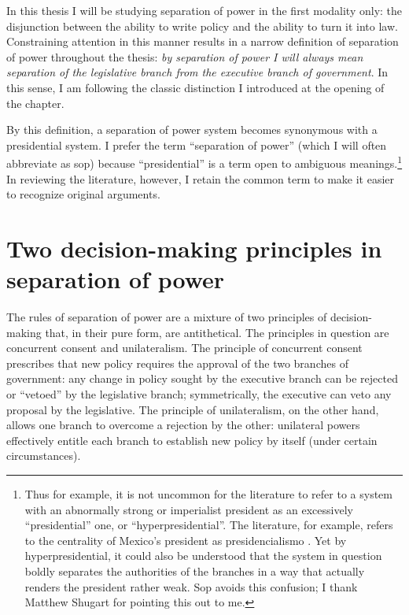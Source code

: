 In this thesis I will be studying separation of power in the first modality only: the disjunction between the ability to write policy and the ability to turn it into law.  Constraining attention in this manner results in a narrow definition of separation of power throughout the thesis: \emph{by separation of power I will always mean separation of the legislative branch from the executive branch of government}.  In this sense, I am following the classic distinction I introduced at the opening of the chapter.  

By this definition, a separation of power system becomes synonymous with a presidential system.  I prefer the term ``separation of power'' (which I will often abbreviate as sop) because ``presidential'' is a term open to ambiguous meanings.\footnote{Thus for example, it is not uncommon for the literature to refer to a system with an abnormally strong or imperialist president as an excessively ``presidential'' one, or ``hyperpresidential''.  The literature, for example, refers to the centrality of Mexico's president as presidencialismo \citep{carpizo.1978,weldon.1997}. Yet by hyperpresidential, it could also be understood that the system in question boldly separates the authorities of the branches in a way that actually renders the president rather weak.  Sop avoids this confusion; I thank Matthew Shugart for pointing this out to me.}  In reviewing the literature, however, I retain the common term to make it easier to recognize original arguments.  

\section{Two decision-making principles in separation of power}

The rules of separation of power are a mixture of two principles of decision-making that, in their pure form, are antithetical.  The principles in question are concurrent consent and unilateralism.  The principle of concurrent consent prescribes that new policy requires the approval of the two branches of government: any change in policy sought by the executive branch can be rejected or ``vetoed'' by the legislative branch; symmetrically, the executive can veto any proposal by the legislative.  The principle of unilateralism, on the other hand, allows one branch to overcome a rejection by the other: unilateral powers effectively entitle each branch to establish new policy by itself (under certain circumstances).  

